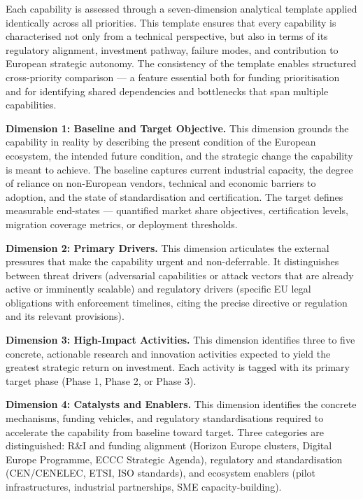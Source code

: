 \documentclass{ieeeaccess}
\begin{document}
Each capability is assessed through a seven-dimension analytical
template applied identically across all priorities. This template
ensures that every capability is characterised not only from a technical
perspective, but also in terms of its regulatory alignment, investment
pathway, failure modes, and contribution to European strategic autonomy.
The consistency of the template enables structured cross-priority
comparison --- a feature essential both for funding prioritisation and
for identifying shared dependencies and bottlenecks that span multiple
capabilities.

\textbf{Dimension 1: Baseline and Target Objective.} This dimension
grounds the capability in reality by describing the present condition of
the European ecosystem, the intended future condition, and the strategic
change the capability is meant to achieve. The baseline captures current
industrial capacity, the degree of reliance on non-European vendors,
technical and economic barriers to adoption, and the state of
standardisation and certification. The target defines measurable
end-states --- quantified market share objectives, certification levels,
migration coverage metrics, or deployment thresholds.

\textbf{Dimension 2: Primary Drivers.} This dimension articulates the
external pressures that make the capability urgent and non-deferrable.
It distinguishes between threat drivers (adversarial capabilities or
attack vectors that are already active or imminently scalable) and
regulatory drivers (specific EU legal obligations with enforcement
timelines, citing the precise directive or regulation and its relevant
provisions).

\textbf{Dimension 3: High-Impact Activities.} This dimension identifies
three to five concrete, actionable research and innovation activities
expected to yield the greatest strategic return on investment. Each
activity is tagged with its primary target phase (Phase 1, Phase 2, or
Phase 3).

\textbf{Dimension 4: Catalysts and Enablers.} This dimension identifies
the concrete mechanisms, funding vehicles, and regulatory
standardisations required to accelerate the capability from baseline
toward target. Three categories are distinguished: R\&I and funding
alignment (Horizon Europe clusters, Digital Europe Programme, ECCC
Strategic Agenda), regulatory and standardisation (CEN/CENELEC, ETSI,
ISO standards), and ecosystem enablers (pilot infrastructures,
industrial partnerships, SME capacity-building).
\end{document}
